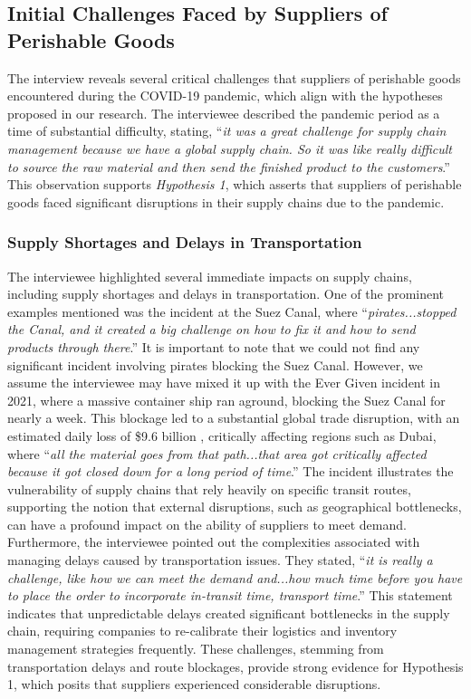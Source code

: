 \subsection{Initial Challenges Faced by Suppliers of Perishable Goods}

The interview reveals several critical challenges that suppliers of perishable goods encountered during the COVID-19 pandemic, which align with the hypotheses proposed in our research. The interviewee described the pandemic period as a time of substantial difficulty, stating, “\textit{it was a great challenge for supply chain management because we have a global supply chain. So it was like really difficult to source the raw material and then send the finished product to the customers}.” This observation supports \textit{Hypothesis 1}, which asserts that suppliers of perishable goods faced significant disruptions in their supply chains due to the pandemic.

\subsubsection{Supply Shortages and Delays in Transportation}

The interviewee highlighted several immediate impacts on supply chains, including supply shortages and delays in transportation. One of the prominent examples mentioned was the incident at the Suez Canal, where “\textit{pirates...stopped the Canal, and it created a big challenge on how to fix it and how to send products through there}.” It is important to note that we could not find any significant incident involving pirates blocking the Suez Canal. However, we assume the interviewee may have mixed it up with the Ever Given incident in 2021, where a massive container ship ran aground, blocking the Suez Canal for nearly a week. This blockage led to a substantial global trade disruption, with an estimated daily loss of \$9.6 billion \parencite{Harper2021SuezDay}, critically affecting regions such as Dubai, where “\textit{all the material goes from that path...that area got critically affected because it got closed down for a long period of time}.” The incident illustrates the vulnerability of supply chains that rely heavily on specific transit routes, supporting the notion that external disruptions, such as geographical bottlenecks, can have a profound impact on the ability of suppliers to meet demand. Furthermore, the interviewee pointed out the complexities associated with managing delays caused by transportation issues. They stated, “\textit{it is really a challenge, like how we can meet the demand and...how much time before you have to place the order to incorporate in-transit time, transport time}.” This statement indicates that unpredictable delays created significant bottlenecks in the supply chain, requiring companies to re-calibrate their logistics and inventory management strategies frequently. These challenges, stemming from transportation delays and route blockages, provide strong evidence for Hypothesis 1, which posits that suppliers experienced considerable disruptions.

